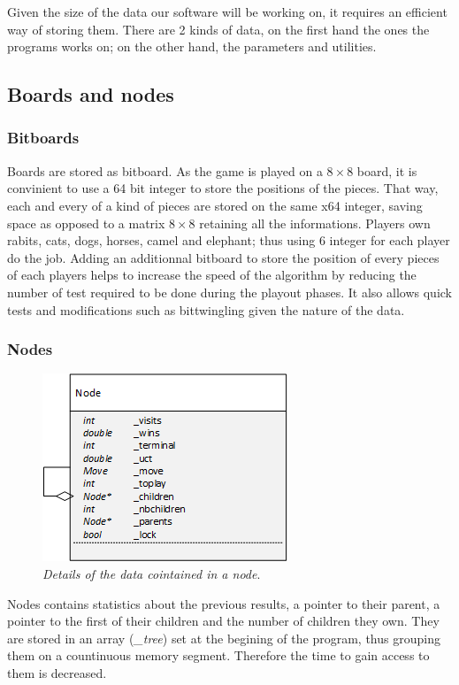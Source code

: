 Given the size of the data our software will be working on, it requires an efficient way of storing them. There are 2 kinds of data, on the first hand the ones the programs works on; on the other hand, the parameters and utilities.
\subsection{Boards and nodes}
\subsubsection{Bitboards}
Boards are stored as bitboard. As the game is played on a \ensuremath{8\times8} board, it is convinient to use a 64 bit integer to store the positions of the pieces. That way, each and every of a kind of pieces are stored on the same x64 integer, saving space as opposed to a matrix \ensuremath{8\times8} retaining all the informations. Players own rabits, cats, dogs, horses, camel and elephant; thus using 6 integer for each player do the job. Adding an additionnal bitboard to store the position of every pieces of each players helps to increase the speed of the algorithm by reducing the number of test required to be done during the playout phases. It also allows quick tests and modifications such as bittwingling given the nature of the data.

\subsubsection{Nodes}
\begin{figure}[H] 
\centerline{\includegraphics[scale=0.8]{Data_Structure/Img/Node.png}}
\caption{\label{fig:nodedetails}\textit{Details of the data cointained in a node}.}
\end{figure}
Nodes contains statistics about the previous results, a pointer to their parent, a pointer to the first of their children and the number of children they own. They are stored in an array (\textit{\_tree}) set at the begining of the program, thus grouping them on a countinuous memory segment. Therefore the time to gain access to them is decreased.

